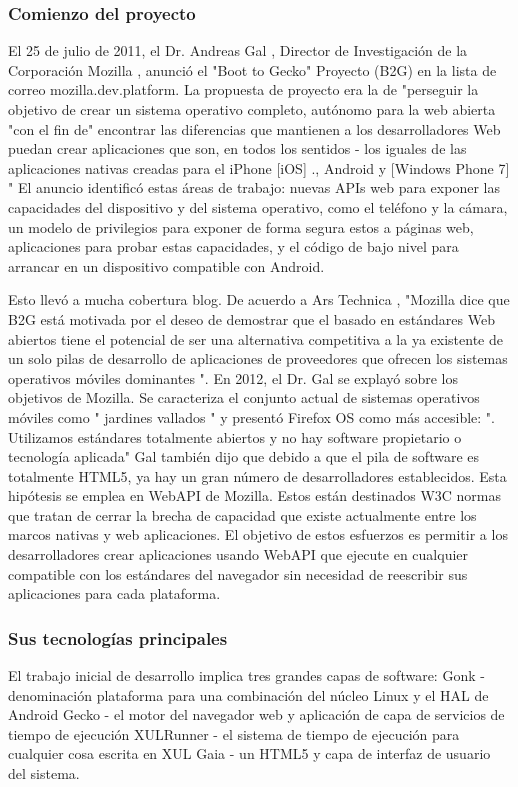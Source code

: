 \subsubsection*{Comienzo del proyecto}
El 25 de julio de 2011, el Dr. Andreas Gal , Director de Investigación de la Corporación Mozilla , anunció el "Boot to Gecko" Proyecto (B2G) en la lista de correo 
mozilla.dev.platform. La propuesta de proyecto era la de "perseguir la objetivo de crear un sistema operativo completo, autónomo para la web abierta "con el fin de" encontrar las 
diferencias que mantienen a los desarrolladores Web puedan crear aplicaciones que son, en todos los sentidos - los iguales de las aplicaciones nativas creadas para el iPhone 
[iOS] ., Android y [Windows Phone 7] " El anuncio identificó estas áreas de trabajo: nuevas APIs web para exponer las capacidades del dispositivo y del sistema operativo, como el 
teléfono y la cámara, un modelo de privilegios para exponer de forma segura estos a páginas web, aplicaciones para probar estas capacidades, y el código de bajo nivel para 
arrancar en un dispositivo compatible con Android.

Esto llevó a mucha cobertura blog. De acuerdo a Ars Technica , "Mozilla dice que B2G está motivada por el deseo de demostrar que el basado en estándares Web abiertos tiene el 
potencial de ser una alternativa competitiva a la ya existente de un solo pilas de desarrollo de aplicaciones de proveedores que ofrecen los sistemas operativos móviles 
dominantes ". En 2012, el Dr. Gal se explayó sobre los objetivos de Mozilla. Se caracteriza el conjunto actual de sistemas operativos móviles como " jardines vallados " y 
presentó Firefox OS como más accesible: ". Utilizamos estándares totalmente abiertos y no hay software propietario o tecnología aplicada"  Gal también dijo que debido a que el 
pila de software es totalmente HTML5, ya hay un gran número de desarrolladores establecidos. Esta hipótesis se emplea en WebAPI de Mozilla. Estos están destinados W3C normas que 
tratan de cerrar la brecha de capacidad que existe actualmente entre los marcos nativas y web aplicaciones. El objetivo de estos esfuerzos es permitir a los desarrolladores crear 
aplicaciones usando WebAPI que ejecute en cualquier compatible con los estándares del navegador sin necesidad de reescribir sus aplicaciones para cada plataforma.

\subsubsection*{Sus tecnologías principales}
El trabajo inicial de desarrollo implica tres grandes capas de software:
Gonk - denominación plataforma para una combinación del núcleo Linux y el HAL de Android
Gecko - el motor del navegador web y aplicación de capa de servicios de tiempo de ejecución 
XULRunner - el sistema de tiempo de ejecución para cualquier cosa escrita en XUL
Gaia - un HTML5 y capa de interfaz de usuario del sistema.


